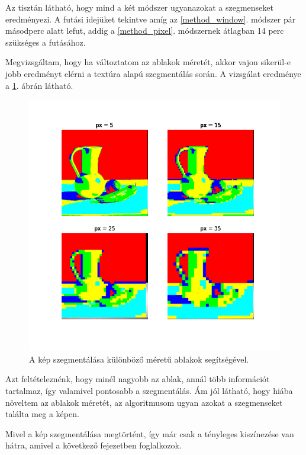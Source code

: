 Az tisztán látható, hogy mind a két módszer ugyanazokat a szegmenseket eredményezi. A futási idejüket tekintve amíg az \ref{method_window}. módszer pár másodperc alatt lefut, addig a \ref{method_pixel}. módszernek átlagban 14 perc szükséges a futásához.

Megvizsgáltam, hogy ha változtatom az ablakok méretét, akkor vajon sikerül-e jobb eredményt elérni a textúra alapú szegmentálás során. A vizsgálat eredménye a \ref{fig:window_different_px}. ábrán látható.

\begin{figure}[h]
\centering
\includegraphics[scale=0.7]{images/window_different_px.png}
\caption{A kép szegmentálása különböző méretű ablakok segítségével.}
\label{fig:window_different_px}
\end{figure}

Azt feltételeznénk, hogy minél nagyobb az ablak, annál több információt tartalmaz, így valamivel pontosabb a szegmentálás. Ám jól látható, hogy hiába növeltem az ablakok méretét, az algoritmusom ugyan azokat a szegmenseket találta meg a képen.

Mivel a kép szegmentálása megtörtént, így már csak a tényleges kiszínezése van hátra, amivel a következő fejezetben foglalkozok. 